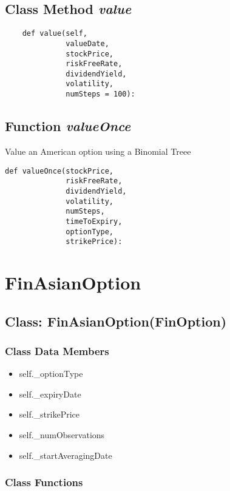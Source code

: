 \documentclass[twoside,11pt]{book}
\begin{document}
\subsection{Class Method {\it value}}


\begin{lstlisting}
    def value(self,
              valueDate,
              stockPrice,
              riskFreeRate,
              dividendYield,
              volatility,
              numSteps = 100):
\end{lstlisting}

\subsection{Function {\it valueOnce}}
Value an American option using a Binomial Treee 

\begin{lstlisting}
def valueOnce(stockPrice,
              riskFreeRate,
              dividendYield,
              volatility,
              numSteps,
              timeToExpiry,
              optionType,
              strikePrice):
\end{lstlisting}

\newpage
\section{FinAsianOption}

\subsection{Class: FinAsianOption(FinOption)}


\subsubsection{Class Data Members}
\begin{itemize}
\item{self.\_optionType}
\item{self.\_expiryDate}
\item{self.\_strikePrice}
\item{self.\_numObservations}
\item{self.\_startAveragingDate}
\end{itemize}

\subsubsection{Class Functions}
\end{document}
